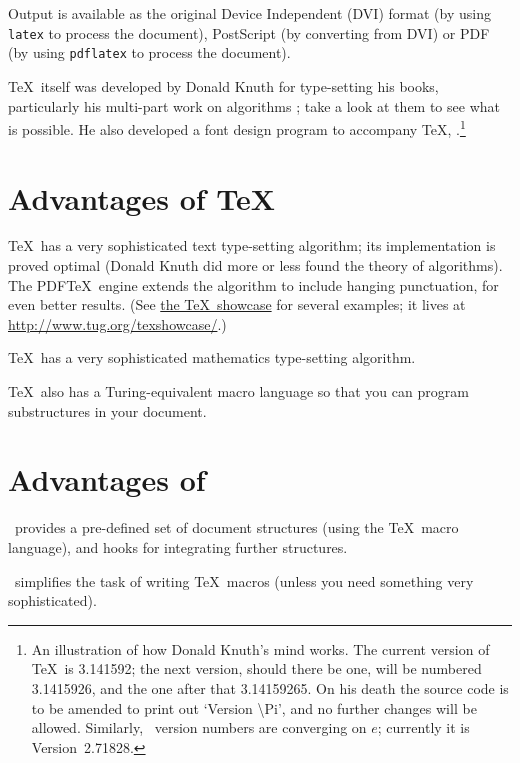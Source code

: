 \documentclass[authoryearcitations]{UoYCSproject}
\begin{document}
Output is available as the original Device Independent (DVI) format
(by using \lstinline|latex| to process the document), PostScript (by
converting from DVI) or PDF (by using \lstinline|pdflatex| to process
the document).

\TeX\ itself was developed by Donald Knuth for type-setting his books,
particularly his multi-part work on algorithms
\citep{Knuth1997,Knuth1998a,Knuth1998b}; take a look at them to see
what is possible.  He also developed a font design program to
accompany \TeX, \MF.\footnote{An illustration of how Donald Knuth's
  mind works.  The current version of \TeX\ is 3.141592; the next
  version, should there be one, will be numbered 3.1415926, and the
  one after that 3.14159265.  On his death the source code is to be
  amended to print out `Version \textbackslash Pi', and no further
  changes will be allowed.  Similarly, \MF\ version numbers are
  converging on \begin{math}e\end{math}; currently it is
  Version~2.71828.}

\section{Advantages of \TeX}
\label{sec:advantagesoftex}

\TeX\ has a very sophisticated text type-setting algorithm; its
implementation is proved optimal (Donald Knuth did more or less found
the theory of algorithms).  The PDF\TeX\ engine extends the algorithm
to include hanging punctuation, for even better results.  (See
\href{http://www.tug.org/texshowcase/}{the \TeX\ showcase} for several
examples; it lives at \url{http://www.tug.org/texshowcase/}.)

\TeX\ has a very sophisticated mathematics type-setting algorithm.

\TeX\ also has a Turing-equivalent macro language so that you can
program substructures in your document.

\section{Advantages of \LaTeXe}
\label{sec:advantagesoflatex}

\LaTeXe\ provides a pre-defined set of document structures (using the
\TeX\ macro language), and hooks for integrating further structures.

\LaTeXe\ simplifies the task of writing \TeX\ macros (unless you need
something very sophisticated).
\end{document}
